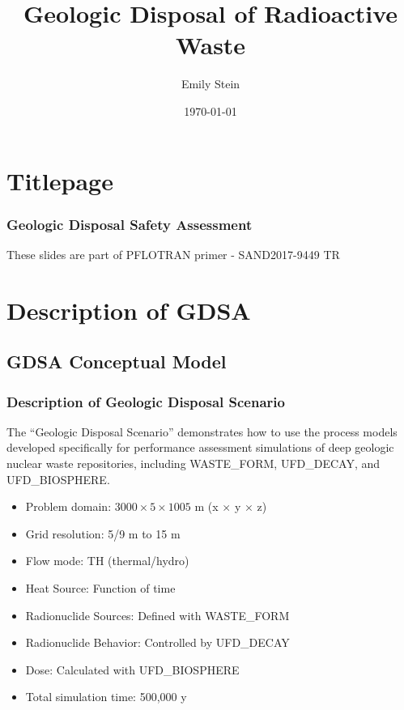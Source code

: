 \documentclass{beamer}
\begin{document}
\title{Geologic Disposal of Radioactive Waste}
\author{Emily Stein}
\date{\today}


\section{Titlepage}

\begin{frame}\frametitle{Geologic Disposal Safety Assessment}
These slides are part of PFLOTRAN primer - SAND2017-9449 TR
\end{frame}
\section{Description of GDSA}

\subsection{GDSA Conceptual Model}

\begin{frame}\frametitle{Description of Geologic Disposal Scenario}
The ``Geologic Disposal Scenario'' demonstrates how to use the process models developed specifically for performance assessment simulations of deep geologic nuclear waste repositories, including WASTE\_FORM, UFD\_DECAY, and UFD\_BIOSPHERE.
\begin{itemize}
  \item Problem domain: $3000 \times 5 \times 1005$ m (x $\times$ y $\times$ z)
  \item Grid resolution: 5/9 m to 15 m
  \item Flow mode: TH (thermal/hydro)
  \item Heat Source: Function of time
  \item Radionuclide Sources: Defined with WASTE\_FORM
  \item Radionuclide Behavior: Controlled by UFD\_DECAY
  \item Dose: Calculated with UFD\_BIOSPHERE
  \item Total simulation time: 500,000 y
\end{itemize}

\end{frame}
\end{document}
